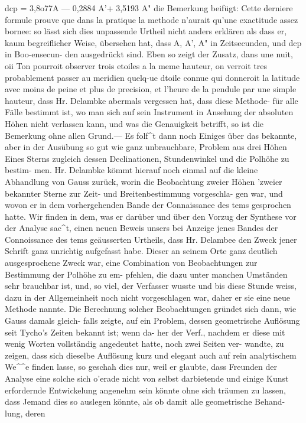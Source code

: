 \documentclass[12pt,a4paper]{article}
\begin{document}
dcp  =  3,8o77A  --- 0,2884  A'+ 3,5193  A" die  Bemerkung   beifügt:    Cette    derniere    formule    prouve    que    dans    la  pratique    la    methode    n'aurait qu'une   exactitude    assez   bornee:    so   lässt  sich  dies  unpassende  Urtheil  nicht  anders  erklären    als  dass er,  kaum  begreiflicher  Weise,  übersehen  hat,  dass   A,  A',  A"  in  Zeitsecunden,  und    dcp   in  Boo-ensecun- den    ausgedrückt    sind.      Eben    so    zeigt    der    Zusatz,   dans   une    nuit,     oii    Ton   pourroit   observer  trois etoiles  a  la  meme  hauteur,    on   verroit  tres   probablement  passer    au  meridien    quelq-ue   dtoile  connue qui  donneroit   la   latitude   avec  moins    de   peine   et   plus    de  precision,   et  l'heure    de  la    pendule   par une  simple   hauteur,    dass   Hr.  Delambke   abermals    vergessen  hat,    dass   diese   Methode-  für  alle    Fälle bestimmt   ist,    wo   man    sich   auf  sein   Instrument    in    Ansehung  der  absoluten  Höhen  nicht    verlassen kann,   und   was   die    Genauigkeit  betrifft,    so   ist    die  Bemerkung   ohne  allen  Grund.---      Es  folf\textasciicircum{}t  dann noch  Einiges  über  das  bekannte,   aber  in   der  Ausübung   so   gut  wie  ganz  unbrauchbare,  Problem    aus drei  Höhen  Eines  Sterns   zugleich    dessen    Declinationen,   Stundenwinkel   und    die    Polhöhe    zu  bestim- men.    Hr.  Delambke  kömmt  hierauf  noch  einmal  auf  die   kleine    Abhandlung  von  Gauss   zurück,  worin die  Beobachtung  zweier  Höhen  'zweier  bekannter  Sterne   zur  Zeit-  und  Breitenbestimmung   vorgeschla- gen war,    und  wovon   er  in   dem  vorhergehenden  Bande    der  Connaissance  des  tems  gesprochen  hatte. Wir  finden  in  dem,    was   er  darüber  und    über  den  Vorzug  der  Synthese  vor  der  Analyse  sac\textasciicircum{}t,   einen neuen  Beweis  unsers  bei  Anzeige  jenes  Bandes  der  Connoissance  des  tems  geäusserten  Urtheils,  dass  Hr. Delambee  den  Zweck  jener  Schrift  ganz  unrichtig  aufgefasst  habe.    Dieser  an  seinem  Orte  ganz  deutlich ausgesprochene  Zweck  war,  eine  Combination  von  Beobachtungen   zur  Bestimmung  der  Polhöhe  zu  em- pfehlen, die  dazu  unter  manchen  Umständen  sehr  brauchbar  ist,  und,  so  viel,  der  Verfasser  wusste  und bis  diese  Stunde  weiss,  dazu  in  der  Allgemeinheit  noch  nicht  vorgeschlagen  war,  daher  er  sie  eine  neue Methode  nannte.     Die  Berechnung  solcher  Beobachtungen  gründet  sich  dann,  wie  Gauss  damals  gleich- falls zeigte,  auf  ein  Problem,  dessen  geometrische  Auflösung  seit  Tycho's  Zeiten  bekannt  ist;  wenn  da- her der  Verf.,  nachdem  er  diese  mit  wenig  Worten  vollständig  angedeutet  hatte,  noch  zwei  Seiten  ver- wandte, zu  zeigen,    dass   sich  dieselbe  Auflösung  kurz  und  elegant  auch    auf  rein  analytischem  We\textasciicircum{}\textasciicircum{}e finden  lasse,  so  geschah  dies  nur,  weil  er  glaubte,  dass  Freunden  der  Analyse   eine  solche   sich  o'erade nicht  von  selbst  darbietende  und  einige  Kunst  erfordernde  Entwickelung  angenehm   sein  könnte     ohne sich  träumen  zu  lassen,  dass  Jemand  dies  so  auslegen  könnte,  als  ob  damit  alle  geometrische  Behand- lung, deren  
\end{document}
